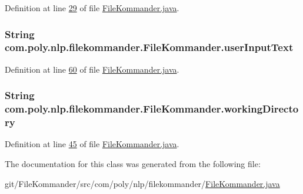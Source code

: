Definition at line \hyperlink{L29}{29} of file \hyperlink{}{File\-Kommander.\-java}.

\hypertarget{classcom_1_1poly_1_1nlp_1_1filekommander_1_1_file_kommander_a499151b0f39dbce7b82a811c8cf21402}{
\subsubsection[{user\-Input\-Text}]{\setlength{\rightskip}{0pt plus 5cm}String com.\-poly.\-nlp.\-filekommander.\-File\-Kommander.\-user\-Input\-Text\hspace{0.3cm}{\ttfamily [private]}}}\label{classcom_1_1poly_1_1nlp_1_1filekommander_1_1_file_kommander_a499151b0f39dbce7b82a811c8cf21402}


Definition at line \hyperlink{L60}{60} of file \hyperlink{}{File\-Kommander.\-java}.

\hypertarget{classcom_1_1poly_1_1nlp_1_1filekommander_1_1_file_kommander_a862ebb1796e89d0d83d348797e7c6472}{
\subsubsection[{working\-Directory}]{\setlength{\rightskip}{0pt plus 5cm}String com.\-poly.\-nlp.\-filekommander.\-File\-Kommander.\-working\-Directory\hspace{0.3cm}{\ttfamily [private]}}}\label{classcom_1_1poly_1_1nlp_1_1filekommander_1_1_file_kommander_a862ebb1796e89d0d83d348797e7c6472}


Definition at line \hyperlink{L45}{45} of file \hyperlink{}{File\-Kommander.\-java}.



The documentation for this class was generated from the following file\-:\begin{DoxyCompactItemize}
\item 
git/\-File\-Kommander/src/com/poly/nlp/filekommander/\hyperlink{_file_kommander_8java}{File\-Kommander.\-java}\end{DoxyCompactItemize}

